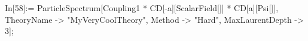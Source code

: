 In[58]:= ParticleSpectrum[Coupling1 * CD[-a][ScalarField[]] * CD[a][Psi[]], TheoryName -> "MyVeryCoolTheory", Method -> "Hard", MaxLaurentDepth -> 3]; 
